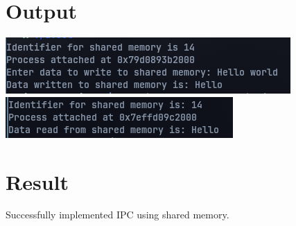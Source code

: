 \section{Output}
\includegraphics[]{Cycle_2//Outputs/writeShraed.png}\\
\includegraphics[]{Cycle_2//Outputs/readShared.png}


\section{Result}
Successfully implemented IPC using shared memory.